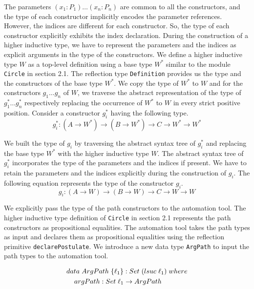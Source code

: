 \documentclass[sigplan,10pt]{acmart}
\begin{document}
The parameters $(x_1:P_1)\ldots(x_n:P_n)$ are common to all the constructors, and the type of each constructor implicitly encodes the parameter references. However, the indices are different for each constructor. So, the type of each constructor explicitly exhibits the index declaration. During the construction of a higher inductive type, we have to represent the parameters and the indices as explicit arguments in the type of the constructors. We define a higher inductive type $W$ as a top-level definition using a base type $W^*$ similar to the module {\tt Circle} in section 2.1. The reflection type {\tt Definition} provides us the type and the constructors of the base type $W^*$. We copy the type of $W^*$ to $W$ and for the constructors $g_1 \ldots g_n$ of $W$, we traverse the abstract representation of the type of $g_1^* \ldots g_n^*$ respectively replacing the occurrence of $W^*$ to $W$ in every strict positive position. Consider a constructor $g_i^*$ having the following type.
\begin{equation}
g_i^* : (A \rightarrow W^*) \rightarrow (B \rightarrow W^*) \rightarrow C \rightarrow W^* \rightarrow W^* \nonumber
\end{equation}

We built the type of $g_i$ by traversing the abstract syntax tree of $g_i^*$ and replacing the base type $W^*$ with the higher inductive type $W$. The abstract syntax tree of $g_i^*$ incorporates the type of the parameters and the indices if present. We have to retain the parameters and the indices explicitly during the construction of $g_i$. The following equation  represents the type of the constructor $g_i$.
\begin{equation}
g_i : (A \rightarrow W) \rightarrow (B \rightarrow W) \rightarrow C \rightarrow W \rightarrow W \nonumber
\end{equation}

We explicitly pass the type of the path constructors to the automation tool. The higher inductive type definition of {\tt Circle} in section 2.1 represents the path constructors as propositional equalities. The automation tool takes the path types as input and declares them as propositional equalities using the reflection primitive {\tt declarePostulate}. We introduce a new data type {\tt ArgPath} to input the path types to the automation tool.
\begin{center}
\begingroup
\fontsize{7.9pt}{0pt}\selectfont
\begin{align}
& data \hspace {0.1cm} ArgPath \hspace {0.1cm} \{\ell_1\} : Set \hspace {0.1cm} (lsuc \hspace {0.1cm} \ell_1) \hspace {0.1cm} where \nonumber \\
& \hspace {0.4cm} argPath : Set \hspace {0.1cm} \ell_1 \rightarrow ArgPath \nonumber \\ \nonumber
\end{align}
\endgroup
\end{center}
\normalsize
\end{document}

